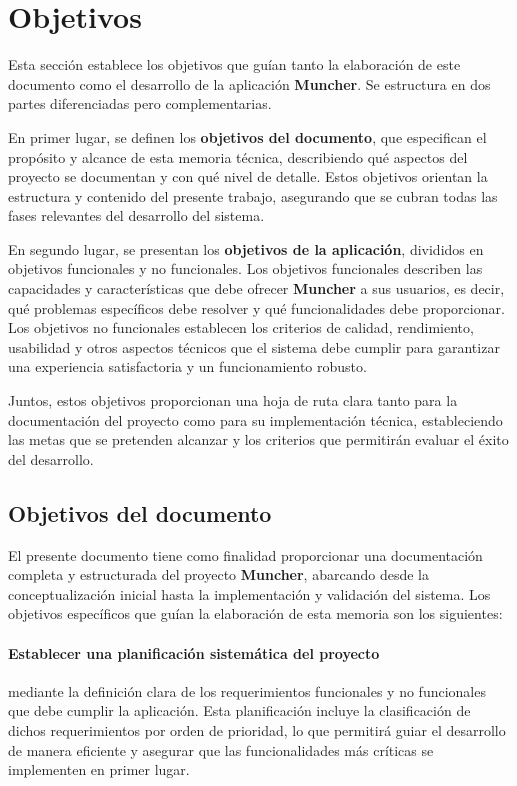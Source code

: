 \section*{Objetivos}

Esta sección establece los objetivos que guían tanto la elaboración de este documento como el desarrollo de la aplicación \textbf{Muncher}. Se estructura en dos partes diferenciadas pero complementarias.

En primer lugar, se definen los \textbf{objetivos del documento}, que especifican el propósito y alcance de esta memoria técnica, describiendo qué aspectos del proyecto se documentan y con qué nivel de detalle. Estos objetivos orientan la estructura y contenido del presente trabajo, asegurando que se cubran todas las fases relevantes del desarrollo del sistema.

En segundo lugar, se presentan los \textbf{objetivos de la aplicación}, divididos en objetivos funcionales y no funcionales. Los objetivos funcionales describen las capacidades y características que debe ofrecer \textbf{Muncher} a sus usuarios, es decir, qué problemas específicos debe resolver y qué funcionalidades debe proporcionar. Los objetivos no funcionales establecen los criterios de calidad, rendimiento, usabilidad y otros aspectos técnicos que el sistema debe cumplir para garantizar una experiencia satisfactoria y un funcionamiento robusto.

Juntos, estos objetivos proporcionan una hoja de ruta clara tanto para la documentación del proyecto como para su implementación técnica, estableciendo las metas que se pretenden alcanzar y los criterios que permitirán evaluar el éxito del desarrollo.

\subsection*{Objetivos del documento}

El presente documento tiene como finalidad proporcionar una documentación completa y estructurada del proyecto \textbf{Muncher}, abarcando desde la conceptualización inicial hasta la implementación y validación del sistema. Los objetivos específicos que guían la elaboración de esta memoria son los siguientes:

\paragraph*{Establecer una planificación sistemática del proyecto}
mediante la definición clara de los requerimientos funcionales y no funcionales que debe cumplir la aplicación. Esta planificación incluye la clasificación de dichos requerimientos por orden de prioridad, lo que permitirá guiar el desarrollo de manera eficiente y asegurar que las funcionalidades más críticas se implementen en primer lugar.

